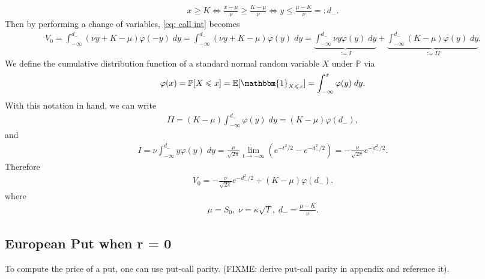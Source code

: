 \documentclass[reqno]{amsart}
\begin{document}
\begin{align}
	 x \ge K \Longleftrightarrow \frac{x-\mu}{\nu} \ge \frac{K - \mu}{\nu} \Longleftrightarrow y \le \frac{\mu - K}{\nu} =: d_-.
\end{align}
Then by performing a change of variables, \eqref{eq: call int} becomes 
\begin{align}
	 V_0 = \int_{-\infty}^{d_-} (\nu y + K - \mu) \varphi(-y) \; dy = \int_{-\infty}^{d_-} (\nu y + K - \mu) \varphi(y) \; dy = \underbrace{\int_{-\infty}^{d_-} \nu y \varphi(y) \; dy}_{:= I} + \underbrace{\int_{-\infty}^{d_-}  (K-\mu)\varphi(y) \; dy}_{:= II}.
\end{align}
We define the cumulative distribution function of a standard normal random variable $X$ under $\mathbb{P}$ via 
\begin{align}
	 \varphi(x) = \mathbb{P}[X \le x] = \E[ \mathbbm{1}_{X \le x}] = \int_{-\infty}^x \varphi(y) \; dy.
\end{align}
With this notation in hand, we can write 
\begin{align}
	 II = (K-\mu) \int_{-\infty}^{d_-} \varphi(y) \; dy = (K-\mu) \varphi(d_-),
\end{align}
and 
\begin{align}
	 I = \nu \int_{-\infty}^{d_-} y \varphi(y) \; dy =  \frac{\nu}{\sqrt{2\pi}} \lim_{t \to -\infty} (e^{-t^2/2} - e^{-d_-^2/2}) = -\frac{\nu}{\sqrt{2\pi}} e^{-d_-^2/2}.
\end{align}
Therefore 
\begin{align}
	 V_0 =  -\frac{\nu}{\sqrt{2\pi}} e^{-d_-^2/2} + (K-\mu) \varphi(d_-).
\end{align}
where 
\begin{align}
	 \mu = S_0, \; \nu = \kappa \sqrt{T}, \; d_- = \frac{\mu - K}{\nu}.
\end{align}

\subsection{European Put when r = 0}
To compute the price of a put, one can use put-call parity.
(FIXME: derive put-call parity in appendix and reference it). 
\end{document}
